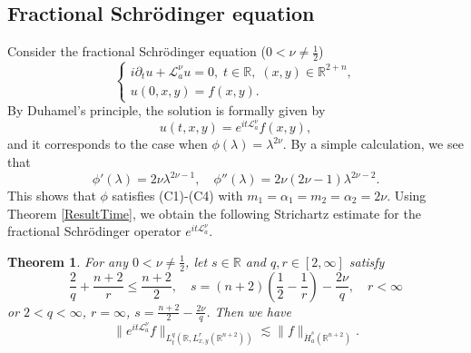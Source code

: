 \documentclass[a4paper,11pt, reqno]{amsart}
\numberwithin{equation}{section}
\theoremstyle{plain}
\newtheorem{theorem}{Theorem}[section]
\theoremstyle{definition}
\theoremstyle{remark}
\begin{document}
\subsection{Fractional Schr\"{o}dinger equation} Consider the fractional Schr\"{o}dinger equation ($0<\nu\neq \frac{1}{2}$)
    \begin{equation}\label{FSchrEqu}
	\begin{cases}
	i\partial_tu+\mathcal{L}_a^\nu u=0,\;t\in\mathbb{R},\; (x,y)\in\mathbb{R}^{2+n},\\
	u(0,x,y)=f(x,y).
	\end{cases}
	\end{equation}
By Duhamel's principle, the solution is formally given by
	\begin{equation*}\label{solution1}
	u(t,x,y)=e^{it\mathcal{L}_a^\nu}f(x,y),
	\end{equation*}
and it corresponds to the case when $\phi(\lambda)=\lambda^{2\nu}$. By a simple calculation, we see that 
	\begin{equation*}
	\phi'(\lambda)=2\nu \lambda^{2\nu-1}, \quad
	\phi''(\lambda)=2\nu(2\nu-1)\lambda^{2\nu-2}.
	\end{equation*}
This shows that $\phi$ satisfies (C1)-(C4) with $m_1=\alpha_1=m_2=\alpha_2=2\nu$. Using Theorem \ref{ResultTime}, we obtain the following Strichartz estimate for the fractional Schr\"odinger operator $e^{it\mathcal{L}_a^\nu}$.
\begin{theorem}\label{Intermediate-fractional} For any $0<\nu\neq\frac{1}{2}$, let $s\in\mathbb{R}$ and $q,r\in [2,\infty]$ satisfy
\begin{equation*}
\frac{2}{q}+\frac{n+2}{r}\leq \frac{n+2}{2},\quad s=(n+2)\left(\frac{1}{2}-\frac{1}{r}\right)-\frac{2\nu}{q}, \quad r<\infty
\end{equation*}
or $2<q<\infty$, $r=\infty$, $s=\frac{n+2}{2}-\frac{2\nu}{q}$. Then we have
\begin{equation*}
\|e^{it\mathcal{L}_a^\nu}f\|_{L_t^q(\mathbb{R},L^r_{x,y}(\mathbb{R}^{n+2}))}\lesssim \|f\|_{\dot{H}^s_a(\mathbb{R}^{n+2})}.
\end{equation*}
\end{theorem}
\end{document}
